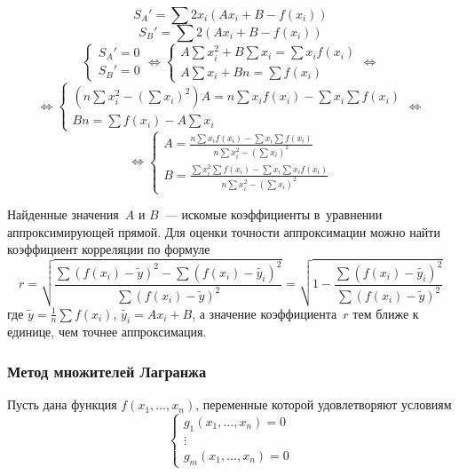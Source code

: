 \begin{equation*}
S_A' = \sum 2 x_i (A x_i + B - f(x_i))
\end{equation*}
\begin{equation*}
S_B' = \sum 2 (A x_i + B - f(x_i))
\end{equation*}
\begin{equation*}
\begin{cases}
\displaystyle S_A' = 0 \\
\displaystyle S_B' = 0
\end{cases}
\Leftrightarrow
\begin{cases}
\displaystyle A \sum x_i^2 + B \sum x_i = \sum x_i f(x_i) \\
\displaystyle A \sum x_i + Bn = \sum f(x_i)
\end{cases}
\Leftrightarrow
\end{equation*}
\begin{equation*}
\Leftrightarrow
\begin{cases}
\displaystyle \left(n \sum x_i^2 - \left(\sum x_i\right)^2\right)A = n \sum x_i f(x_i) - \sum x_i \sum f(x_i) \\
\displaystyle Bn = \sum f(x_i) - A \sum x_i
\end{cases}
\Leftrightarrow
\end{equation*}
\begin{equation*}
\Leftrightarrow
\begin{cases}
\displaystyle A = \frac{\displaystyle n \sum x_i f(x_i) - \sum x_i \sum f(x_i)}{\displaystyle n \sum x_i^2 - \left(\sum x_i\right)^2} \\
\displaystyle B = \frac{\displaystyle \sum x_i^2 \sum f(x_i) - \sum x_i \sum x_i f(x_i)}{\displaystyle n \sum x_i^2 - \left(\sum x_i\right)^2}
\end{cases}
\end{equation*}
	
Найденные значения~$A$ и $B$~--- искомые коэффициенты в~уравнении аппроксимирующей прямой.
Для оценки точности аппроксимации можно найти коэффициент корреляции по формуле
\begin{equation*}
r = \sqrt{\frac
{\sum (f(x_i) - \tilde y)^2 - \sum (f(x_i) - \tilde{y_i})^2}
{\sum (f(x_i) - \tilde y)^2}} =
\sqrt{1 - \frac{\sum (f(x_i) - \tilde{y_i})^2}{\sum (f(x_i) - \tilde y)^2}}
\end{equation*}
где $\tilde y = \frac1n \sum f(x_i)$, $\tilde{y_i} = A x_i + B$, а значение коэффициента~$r$ тем ближе к единице, чем точнее аппроксимация.
	
\subsubsection{Метод множителей Лагранжа}
Пусть дана функция $f(x_1, \ldots, x_n)$, переменные которой удовлетворяют условиям
\begin{equation*}
\begin{cases}
g_1(x_1, \ldots, x_n) = 0 \\
\vdots \\
g_m(x_1, \ldots, x_n) = 0
\end{cases}
\end{equation*}

